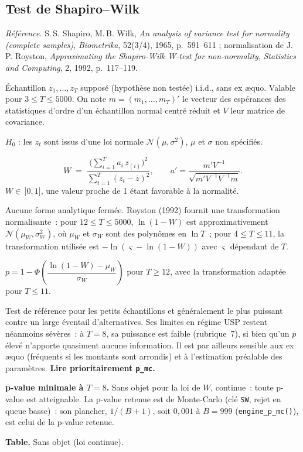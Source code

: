 \documentclass[a4paper,11pt]{article}
\newcommand{\code}[1]{\texttt{\small #1}}
\newcommand{\refl}[1]{{\small\textcolor{maincolor!70!black}{\textit{Référence.} #1}}\par\smallskip}
\newcounter{ficheid}
\newenvironment{fiche}[1]{%
  \stepcounter{ficheid}%
  \phantomsection
  \subsection{#1}%
  \label{fiche:\theficheid}%
}{%
  \end{description}\vspace{0.5em}%
}
\newcommand{\Cadre}{%
  \begin{description}[leftmargin=0pt, style=unboxed, itemsep=3pt, topsep=3pt, parsep=2pt]%
  \item[\textcolor{financeblue}{\textbf{1. Cadre, notations et hypothèses de validité (non testées).}}]}
\newcommand{\Hzero}{\item[\textcolor{financeblue}{\textbf{2. Hypothèse nulle.}}]}
\newcommand{\Stat}{\item[\textcolor{financeblue}{\textbf{3. Statistique de test.}}]}
\newcommand{\Loi}{\item[\textcolor{financeblue}{\textbf{4. Loi sous $H_0$.}}]}
\newcommand{\Pval}{\item[\textcolor{financeblue}{\textbf{5. p-value.}}]}
\newcommand{\Usage}{\item[\textcolor{financeblue}{\textbf{6. Usage et limites.}}]}
\newcommand{\Pertinence}{\item[\textcolor{financeblue}{\textbf{7. Pertinence et puissance à faible $T$.}}]}
\begin{document}
\begin{fiche}{Test de Shapiro--Wilk}
\label{fiche:shapiro-wilk}%
\refl{S.\,S. Shapiro, M.\,B. Wilk, \emph{An analysis of variance test for normality (complete
samples)}, \emph{Biometrika}, 52(3/4), 1965, p.~591--611 ; normalisation de J.\,P. Royston,
\emph{Approximating the Shapiro-Wilk W-test for non-normality}, \emph{Statistics and Computing},
2, 1992, p.~117--119.}
\Cadre
Échantillon $z_1,\dots,z_T$ supposé (hypothèse non testée) i.i.d., sans ex \ae quo. Valable pour
$3 \le T \le 5000$. On note $m = (m_1,\dots,m_T)'$ le vecteur des espérances des statistiques
d'ordre d'un échantillon normal centré réduit et $V$ leur matrice de covariance.
\Hzero
$H_0$ : les $z_t$ sont issus d'une loi normale $\mathcal{N}(\mu,\sigma^2)$, $\mu$ et $\sigma$ non
spécifiés.
\Stat
\[
  W \;=\; \frac{\Big(\sum_{i=1}^{T} a_i\, z_{(i)}\Big)^{2}}{\sum_{t=1}^{T} (z_t - \bar z)^2},
  \qquad
  a' = \frac{m' V^{-1}}{\sqrt{m' V^{-1} V^{-1} m}} .
\]
$W \in\, ]0,1]$, une valeur proche de 1 étant favorable à la normalité.
\Loi
Aucune forme analytique fermée. Royston (1992) fournit une transformation normalisante~: pour
$12 \le T \le 5000$, $\ln(1-W)$ est approximativement $\mathcal{N}(\mu_W, \sigma_W^2)$, où $\mu_W$
et $\sigma_W$ sont des polynômes en $\ln T$~; pour $4 \le T \le 11$, la transformation utilisée
est $-\ln(\varsigma - \ln(1-W))$ avec $\varsigma$ dépendant de $T$.
\Pval
$p = 1 - \Phi\!\left(\dfrac{\ln(1-W) - \mu_W}{\sigma_W}\right)$ pour $T \ge 12$, avec la
transformation adaptée pour $T \le 11$.
\Usage
Test de référence pour les petits échantillons et généralement le plus puissant contre un large
éventail d'alternatives. Ses limites en régime USP restent néanmoins sévères~: à $T = 8$, sa
puissance est faible (rubrique~7), si bien qu'un $p$ élevé n'apporte quasiment aucune information. Il est par ailleurs sensible aux
ex \ae quo (fréquents si les montants sont arrondis) et à l'estimation préalable des paramètres.
\textbf{Lire prioritairement \code{p\_mc}.}
\Pertinence
\textbf{p-value minimale à $T = 8$.} Sans objet pour la loi de $W$, continue~: toute p-value est atteignable. La p-value retenue est de Monte-Carlo (clé \code{SW}, rejet en queue basse)~: son plancher, $1/(B+1)$, soit $0{,}001$ à $B = 999$ (\code{engine\_p\_mc()}), est celui de la p-value retenue.

\textbf{Table.} Sans objet (loi continue).


\end{fiche}
\end{document}
